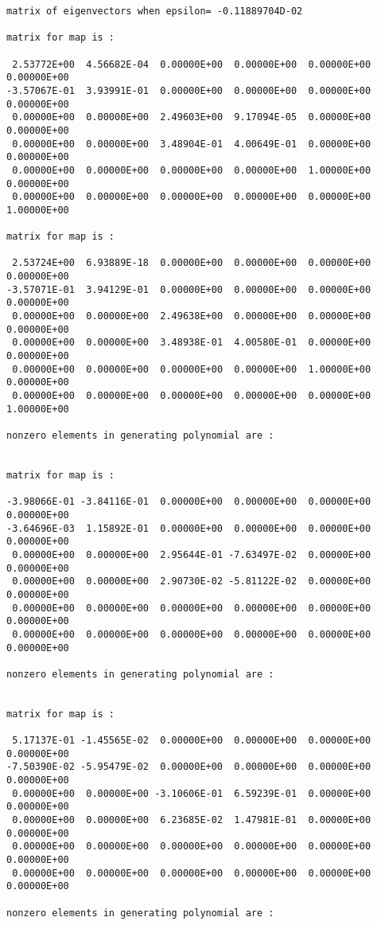 \begin{footnotesize}
\begin{verbatim}
matrix of eigenvectors when epsilon= -0.11889704D-02

matrix for map is :

 2.53772E+00  4.56682E-04  0.00000E+00  0.00000E+00  0.00000E+00  0.00000E+00
-3.57067E-01  3.93991E-01  0.00000E+00  0.00000E+00  0.00000E+00  0.00000E+00
 0.00000E+00  0.00000E+00  2.49603E+00  9.17094E-05  0.00000E+00  0.00000E+00
 0.00000E+00  0.00000E+00  3.48904E-01  4.00649E-01  0.00000E+00  0.00000E+00
 0.00000E+00  0.00000E+00  0.00000E+00  0.00000E+00  1.00000E+00  0.00000E+00
 0.00000E+00  0.00000E+00  0.00000E+00  0.00000E+00  0.00000E+00  1.00000E+00

matrix for map is :

 2.53724E+00  6.93889E-18  0.00000E+00  0.00000E+00  0.00000E+00  0.00000E+00
-3.57071E-01  3.94129E-01  0.00000E+00  0.00000E+00  0.00000E+00  0.00000E+00
 0.00000E+00  0.00000E+00  2.49638E+00  0.00000E+00  0.00000E+00  0.00000E+00
 0.00000E+00  0.00000E+00  3.48938E-01  4.00580E-01  0.00000E+00  0.00000E+00
 0.00000E+00  0.00000E+00  0.00000E+00  0.00000E+00  1.00000E+00  0.00000E+00
 0.00000E+00  0.00000E+00  0.00000E+00  0.00000E+00  0.00000E+00  1.00000E+00

nonzero elements in generating polynomial are :


matrix for map is :

-3.98066E-01 -3.84116E-01  0.00000E+00  0.00000E+00  0.00000E+00  0.00000E+00
-3.64696E-03  1.15892E-01  0.00000E+00  0.00000E+00  0.00000E+00  0.00000E+00
 0.00000E+00  0.00000E+00  2.95644E-01 -7.63497E-02  0.00000E+00  0.00000E+00
 0.00000E+00  0.00000E+00  2.90730E-02 -5.81122E-02  0.00000E+00  0.00000E+00
 0.00000E+00  0.00000E+00  0.00000E+00  0.00000E+00  0.00000E+00  0.00000E+00
 0.00000E+00  0.00000E+00  0.00000E+00  0.00000E+00  0.00000E+00  0.00000E+00

nonzero elements in generating polynomial are :


matrix for map is :

 5.17137E-01 -1.45565E-02  0.00000E+00  0.00000E+00  0.00000E+00  0.00000E+00
-7.50390E-02 -5.95479E-02  0.00000E+00  0.00000E+00  0.00000E+00  0.00000E+00
 0.00000E+00  0.00000E+00 -3.10606E-01  6.59239E-01  0.00000E+00  0.00000E+00
 0.00000E+00  0.00000E+00  6.23685E-02  1.47981E-01  0.00000E+00  0.00000E+00
 0.00000E+00  0.00000E+00  0.00000E+00  0.00000E+00  0.00000E+00  0.00000E+00
 0.00000E+00  0.00000E+00  0.00000E+00  0.00000E+00  0.00000E+00  0.00000E+00

nonzero elements in generating polynomial are :



\end{verbatim}
\end{footnotesize}
